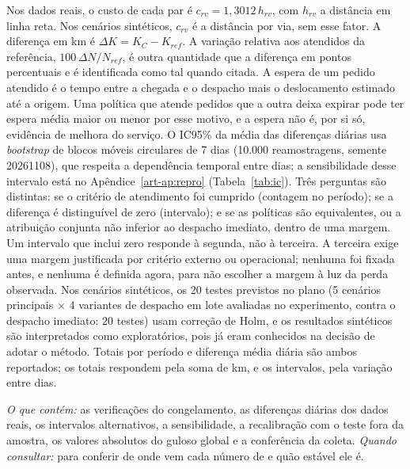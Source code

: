 Nos dados reais, o custo de cada par é $c_{rv}=1{,}3012\,h_{rv}$, com $h_{rv}$ a distância em linha reta. Nos cenários sintéticos, $c_{rv}$ é a distância por via, sem esse fator. A diferença em km é $\Delta K = K_C - K_{ref}$. A variação relativa aos atendidos da referência, $100\,\Delta N/N_{ref}$, é outra quantidade que a diferença em pontos percentuais e é identificada como tal quando citada. A espera de um pedido atendido é o tempo entre a chegada e o despacho mais o deslocamento estimado até a origem. Uma política que atende pedidos que a outra deixa expirar pode ter espera média maior ou menor por esse motivo, e a espera não é, por si só, evidência de melhora do serviço. O IC95\% da média das diferenças diárias usa \textit{bootstrap} de blocos móveis circulares de 7 dias (10.000 reamostragens, semente 20261108), que respeita a dependência temporal entre dias; a sensibilidade desse intervalo está no Apêndice~\ref{art-ap:repro} (Tabela~\ref{tab:ic}). Três perguntas são distintas: se o critério de atendimento foi cumprido (contagem no período); se a diferença é distinguível de zero (intervalo); e se as políticas são equivalentes, ou a atribuição conjunta não inferior ao despacho imediato, dentro de uma margem. Um intervalo que inclui zero responde à segunda, não à terceira. A terceira exige uma margem justificada por critério externo ou operacional; nenhuma foi fixada antes, e nenhuma é definida agora, para não escolher a margem à luz da perda observada. Nos cenários sintéticos, os 20 testes previstos no plano (5 cenários principais $\times$ 4 variantes de despacho em lote avaliadas no experimento, contra o despacho imediato: 20 testes) usam correção de Holm, e os resultados sintéticos são interpretados como exploratórios, pois já eram conhecidos na decisão de adotar o método. Totais por período e diferença média diária são ambos reportados; os totais respondem pela soma de km, e os intervalos, pela variação entre dias.


\textit{O que contém:} as verificações do congelamento, as diferenças diárias dos dados reais, os intervalos alternativos, a sensibilidade, a recalibração com o teste fora da amostra, os valores absolutos do guloso global e a conferência da coleta. \textit{Quando consultar:} para conferir de onde vem cada número de  e quão estável ele é.

